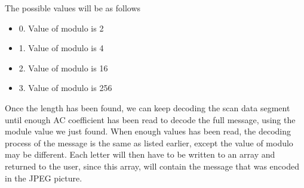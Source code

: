 The possible values will be as follows
\begin{itemize}
	\item 0. Value of modulo is 2
	\item 1. Value of modulo is 4
	\item 2. Value of modulo is 16
	\item 3. Value of modulo is 256
\end{itemize}
Once the length has been found, we can keep decoding the scan data segment until enough AC coefficient has been read to decode the full message, using the module value we just found.
When enough values has been read, the decoding process of the message is the same as listed earlier, except the value of modulo may be different. 
Each letter will then have to be written to an array and returned to the user, since this array, will contain the message that was encoded in the JPEG picture.